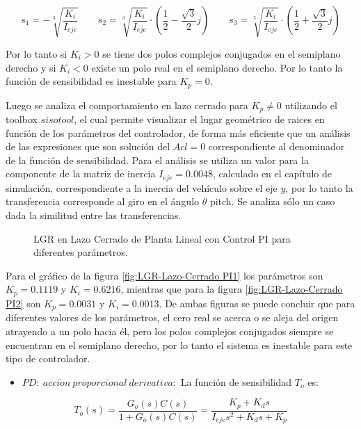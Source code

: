 \documentclass[\main/main.tex]{subfiles}
\begin{document}
\[
s_{1}=-\sqrt[3]{\frac{K_{i}}{I_{eje}}}\qquad s_{2}=\sqrt[3]{\frac{K_{i}}{I_{eje}}}\cdot(\frac{1}{2}-\frac{\sqrt{3}}{2}j)\qquad s_{3}=\sqrt[3]{\frac{K_{i}}{I_{eje}}}\cdot(\frac{1}{2}+\frac{\sqrt{3}}{2}j)
\]

Por lo tanto si $K_{i}>0$ se tiene dos polos complejos conjugados
en el semiplano derecho y si $K_{i}<0$ existe un polo real en el
semiplano derecho. Por lo tanto la función de sensibilidad es inestable
para $K_{p}=0$. 

Luego se analiza el comportamiento en lazo cerrado para $K_{p}\neq0$
utilizando el toolbox $sisotool$, el cual permite visualizar el lugar
geométrico de raices en función de los parámetros del controlador,
de forma más eficiente que un análisis de las expresiones que son
solución del $Acl=0$ correspondiente al denominador de la función
de sensibilidad. Para el análisis se utiliza un valor para la componente
de la matriz de inercia $I_{eje}=0.0048$, calculado en el capítulo
de simulación, correspondiente a la inercia del vehículo sobre el
eje $y$, por lo tanto la transferencia corresponde al giro en el
ángulo $\theta$ pitch. Se analiza sólo un caso dada la similitud
entre las transferencias.

\begin{figure}[H]
\noindent \begin{centering}
\par\end{centering}
\caption{LGR en Lazo Cerrado de Planta Lineal con Control PI para diferentes
parámetros.}
\end{figure}

Para el gráfico de la figura \ref{fig:LGR-Lazo-Cerrado PI1} los parámetros
son $K_{p}=0.1119$ y $K_{i}=0.6216$, mientras que para la figura
\ref{fig:LGR-Lazo-Cerrado PI2} son $K_{p}=0.0031$ y $K_{i}=0.0013$.
De ambas figuras se puede concluir que para diferentes valores de
los parámetros, el cero real se acerca o se aleja del origen atrayendo
a un polo hacia él, pero los polos complejos conjugados siempre se
encuentran en el semiplano derecho, por lo tanto el sistema es inestable
para este tipo de controlador.
\begin{itemize}
\item $PD:\ acci\acute{o}n\ proporcional\ derivativa:$ La función de sensibilidad
$T_{o}$ es:
\end{itemize}
\[
T_{o}(s)=\frac{G_{o}(s)C(s)}{1+G_{o}(s)C(s)}=\frac{K_{p}+K_{d}s}{I_{eje}s^{2}+K_{d}s+K_{p}}
\]
\end{document}

